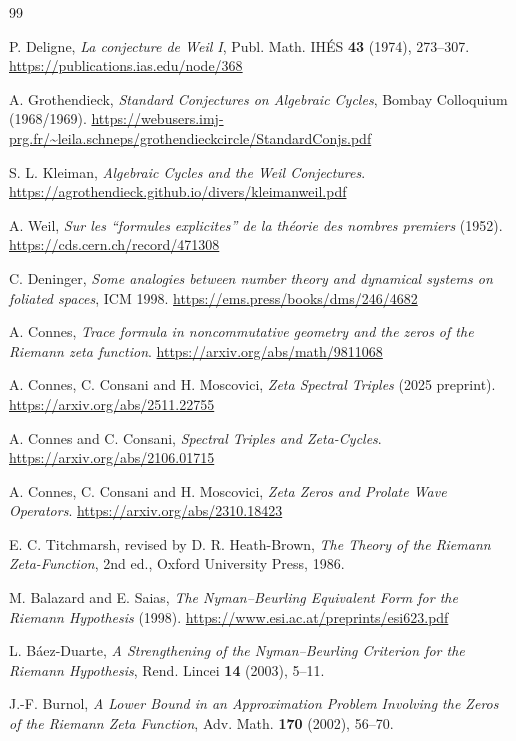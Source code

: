\documentclass[UTF8,11pt,a4paper]{ctexart}
\theoremstyle{definition}
\theoremstyle{remark}
\newcommand{\1}{\mathbf 1}
\begin{document}
\begin{thebibliography}{99}

P. Deligne, \emph{La conjecture de Weil I}, Publ. Math. IH\'ES \textbf{43} (1974), 273--307.
\url{https://publications.ias.edu/node/368}

A. Grothendieck, \emph{Standard Conjectures on Algebraic Cycles}, Bombay Colloquium (1968/1969).
\url{https://webusers.imj-prg.fr/~leila.schneps/grothendieckcircle/StandardConjs.pdf}

S. L. Kleiman, \emph{Algebraic Cycles and the Weil Conjectures}.
\url{https://agrothendieck.github.io/divers/kleimanweil.pdf}

A. Weil, \emph{Sur les ``formules explicites'' de la th\'eorie des nombres premiers} (1952).
\url{https://cds.cern.ch/record/471308}

C. Deninger, \emph{Some analogies between number theory and dynamical systems on foliated spaces}, ICM 1998.
\url{https://ems.press/books/dms/246/4682}

A. Connes, \emph{Trace formula in noncommutative geometry and the zeros of the Riemann zeta function}.
\url{https://arxiv.org/abs/math/9811068}

A. Connes, C. Consani and H. Moscovici, \emph{Zeta Spectral Triples} (2025 preprint).
\url{https://arxiv.org/abs/2511.22755}

A. Connes and C. Consani, \emph{Spectral Triples and Zeta-Cycles}.
\url{https://arxiv.org/abs/2106.01715}

A. Connes, C. Consani and H. Moscovici, \emph{Zeta Zeros and Prolate Wave Operators}.
\url{https://arxiv.org/abs/2310.18423}

E. C. Titchmarsh, revised by D. R. Heath-Brown, \emph{The Theory of the Riemann Zeta-Function}, 2nd ed., Oxford University Press, 1986.

M. Balazard and E. Saias, \emph{The Nyman--Beurling Equivalent Form for the Riemann Hypothesis} (1998).
\url{https://www.esi.ac.at/preprints/esi623.pdf}

L. B\'aez-Duarte, \emph{A Strengthening of the Nyman--Beurling Criterion for the Riemann Hypothesis}, Rend. Lincei \textbf{14} (2003), 5--11.

J.-F. Burnol, \emph{A Lower Bound in an Approximation Problem Involving the Zeros of the Riemann Zeta Function}, Adv. Math. \textbf{170} (2002), 56--70.


\end{thebibliography}
\end{document}
